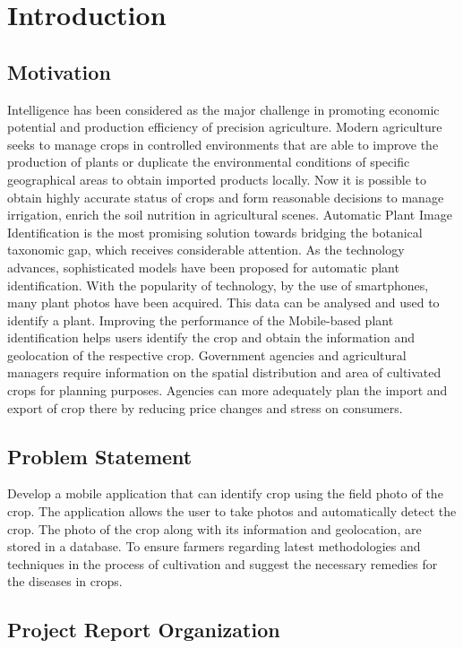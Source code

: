 \documentclass[../Report.tex]{subfiles}
\begin{document}
\chapter{Introduction}

\section{Motivation}

 Intelligence has been considered as the major challenge in promoting economic potential and production efficiency of precision agriculture. Modern agriculture seeks to manage crops in controlled environments that are able to improve the production of plants or duplicate the environmental conditions of specific geographical areas to obtain imported products locally.
 Now it is possible to obtain highly accurate status of crops and form reasonable decisions to manage irrigation, enrich the soil nutrition in agricultural scenes. Automatic Plant Image Identification is the most promising solution towards bridging the botanical taxonomic gap, which receives considerable attention. As the technology advances, sophisticated models have been proposed for automatic plant identification. With the popularity of technology, by the use of smartphones, many plant photos have been acquired. This data can be analysed and used to identify a plant. Improving the performance of the Mobile-based plant identification helps users identify the crop and obtain the information and geolocation of the respective crop. Government agencies and agricultural managers require information on the spatial distribution and area of cultivated crops for planning purposes. Agencies can more adequately plan the import and export of crop there by reducing price changes and stress on consumers.

\section{Problem Statement}
Develop a mobile application that can identify crop using the field photo of the
crop. The application allows the user to take photos and automatically detect the
crop. The photo of the crop along with its information and geolocation, are stored in a database.
To ensure farmers regarding latest methodologies and techniques in the process of cultivation and
suggest the necessary remedies for the diseases in crops.\par


\section{Project Report Organization}
\end{document}
